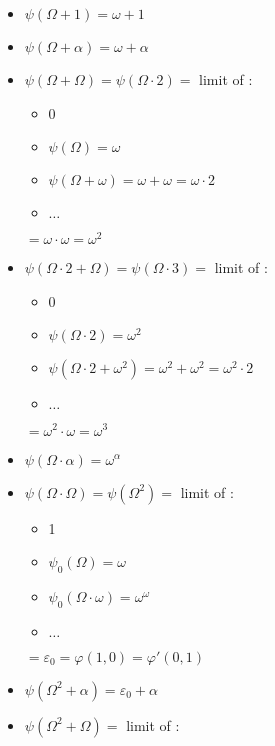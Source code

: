 \documentclass[10pt]{article}
\begin{document}
\begin{itemize}
     \setlength{\itemsep}{1pt}
     \setlength{\parskip}{0pt}
     \setlength{\parsep}{0pt}
\item \( \psi(\Omega+1) = \omega+1 \)
\item \( \psi(\Omega+\alpha) = \omega+\alpha \)
\item \( \psi(\Omega+\Omega) = \psi(\Omega \cdot 2) = \) limit of :
   \begin{itemize}
     \setlength{\itemsep}{1pt}
     \setlength{\parskip}{0pt}
     \setlength{\parsep}{0pt}
   \item 0
   \item \( \psi(\Omega)=\omega \)
   \item \( \psi(\Omega+\omega)=\omega+\omega=\omega \cdot 2 \)
   \item \( \ldots \)
   \end{itemize}
   \( = \omega \cdot \omega = \omega^2 \)
\item \( \psi(\Omega \cdot 2 + \Omega) = \psi(\Omega \cdot 3) = \) limit of :
   \begin{itemize}
     \setlength{\itemsep}{1pt}
     \setlength{\parskip}{0pt}
     \setlength{\parsep}{0pt}
   \item 0
   \item \( \psi(\Omega \cdot 2) = \omega^2 \)
   \item \( \psi(\Omega \cdot 2 + \omega^2) = \omega^2+\omega^2 = \omega^2 \cdot 2 \)
   \item \( \ldots \)
   \end{itemize}
   \( = \omega^2 \cdot \omega = \omega^3 \)
\item \( \psi(\Omega \cdot \alpha) = \omega^\alpha \)
\item \( \psi(\Omega \cdot \Omega) = \psi(\Omega^2) = \) limit of :
   \begin{itemize}
     \setlength{\itemsep}{1pt}
     \setlength{\parskip}{0pt}
     \setlength{\parsep}{0pt}
   \item 1
   \item \( \psi_0(\Omega) = \omega \)
   \item \( \psi_0(\Omega \cdot \omega) = \omega^\omega \)
   \item \( \ldots \)
   \end{itemize}
   \( = \varepsilon_0 = \varphi(1,0) = \varphi'(0,1) \)
\item \( \psi(\Omega^2+\alpha) = \varepsilon_0+\alpha \)
\item \( \psi(\Omega^2+\Omega) = \) limit of :

\end{itemize}
\end{document}
